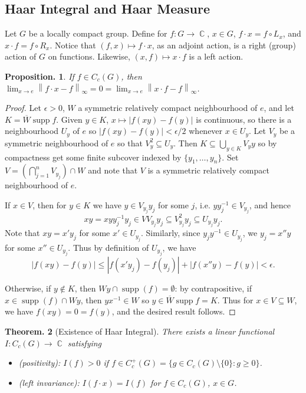 \documentclass[11pt, a4paper]{memoir}
\DeclareMathOperator{\C}{{\mathbb{C}}}
\newcommand{\norm}[1]{\ensuremath{\left\lVert#1\right\rVert}}
\theoremstyle{change}
\newtheorem{theorem}{Theorem.}[section]
\newtheorem{proposition}[theorem]{Proposition.}
\theoremstyle{plain}
\theoremstyle{nonumberplain}
\newtheorem{proof}{Proof}
\DeclareMathOperator{\supp}{supp}
\newcommand{\defname}[1]{{\textit{(#1)}:}}
\numberwithin{equation}{section}
\begin{document}
\subsection{Haar Integral and Haar Measure}
Let $G$ be a locally compact group.
Define for $f:G\to\C$, $x\in G$, $f\cdot x=f\circ L_x$, and $x\cdot f=f\circ R_x$.
Notice that $(f,x)\mapsto f\cdot x$, as an adjoint action, is a right (group) action of $G$ on functions.
Likewise, $(x,f)\mapsto x\cdot f$ is a left action.
\begin{proposition}
    If $f\in C_c(G)$, then $\lim_{x\to e}\norm{f\cdot x-f}_\infty=0=\lim_{x\to e}\norm{x\cdot f-f}_\infty$.
\end{proposition}
\begin{proof}
    Let $\epsilon>0$, $W$ a symmetric relatively compact neighbourhood of $e$, and let $K=\overline{W}\supp f$.
    Given $y\in K$, $x\mapsto|f(xy)-f(y)|$ is continuous, so there is a neighbourhood $U_y$ of $e$ so $|f(xy)-f(y)|<\epsilon/2$ whenever $x\in U_y$.
    Let $V_y$ be a symmetric neighbourhood of $e$ so that $V_y^2\subseteq U_y$.
    Then $K\subseteq\bigcup_{y\in K}V_yy$ so by compactness get some finite subcover indexed by $\{y_1,\ldots,y_n\}$.
    Set $V=\left(\bigcap_{j=1}^n V_{y_j}\right)\cap W$ and note that $V$ is a symmetric relatively compact neighbourhood of $e$.

    If $x\in V$, then for $y\in K$ we have $y\in V_{y_j}y_j$ for some $j$, i.e. $yy_j^{-1}\in V_{y_j}$, and hence
    \begin{equation*}
        xy=xyy_j^{-1}y_j\in VV_{y_j}y_j\subseteq V_{y_j}^2y_j\subseteq U_{y_j}y_j.
    \end{equation*}
    Note that $xy=x'y_j$ for some $x'\in U_{y_j}$.
    Similarly, since $y_jy^{-1}\in U_{y_j}$, we $y_j=x''y$ for some $x''\in U_{y_j}$.
    Thus by definition of $U_{y_j}$, we have
    \begin{equation*}
        |f(xy)-f(y)|\leq|f(x'y_j)-f(y_j)|+|f(x''y)-f(y)|<\epsilon.
    \end{equation*}

    Otherwise, if $y\notin K$, then $Wy\cap\supp(f)=\emptyset$: by contrapositive, if $x\in\supp(f)\cap Wy$, then $yx^{-1}\in W$ so $y\in\overline{W}\supp f=K$.
    Thus for $x\in V\subseteq W$, we have $f(xy)=0=f(y)$, and the desired result follows.
\end{proof}
\begin{theorem}[Existence of Haar Integral]
    There exists a linear functional $I:C_c(G)\to\C$ satisfying
    \begin{itemize}[nl]
        \item \defname{positivity} $I(f)>0$ if $f\in C_c^+(G)=\{g\in C_c(G)\setminus\{0\}:g\geq 0\}$.
        \item \defname{left invariance} $I(f\cdot x)=I(f)$ for $f\in C_c(G)$, $x\in G$.
    \end{itemize}
\end{theorem}
\end{document}
